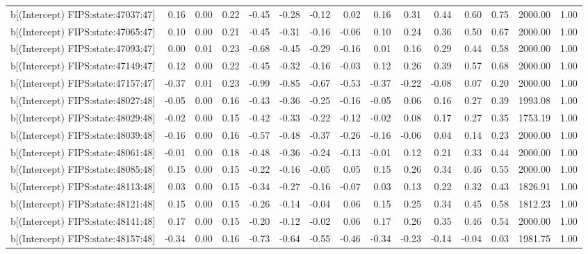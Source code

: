 \begin{table}[ht]
\begin{tabular}{rrrrrrrrrrrrrrr}
  b[(Intercept) FIPS:state:47037:47] & 0.16 & 0.00 & 0.22 & -0.45 & -0.28 & -0.12 & 0.02 & 0.16 & 0.31 & 0.44 & 0.60 & 0.75 & 2000.00 & 1.00 \\ 
  b[(Intercept) FIPS:state:47065:47] & 0.10 & 0.00 & 0.21 & -0.45 & -0.31 & -0.16 & -0.06 & 0.10 & 0.24 & 0.36 & 0.50 & 0.67 & 2000.00 & 1.00 \\ 
  b[(Intercept) FIPS:state:47093:47] & 0.00 & 0.01 & 0.23 & -0.68 & -0.45 & -0.29 & -0.16 & 0.01 & 0.16 & 0.29 & 0.44 & 0.58 & 2000.00 & 1.00 \\ 
  b[(Intercept) FIPS:state:47149:47] & 0.12 & 0.00 & 0.22 & -0.45 & -0.32 & -0.16 & -0.03 & 0.12 & 0.26 & 0.39 & 0.57 & 0.68 & 2000.00 & 1.00 \\ 
  b[(Intercept) FIPS:state:47157:47] & -0.37 & 0.01 & 0.23 & -0.99 & -0.85 & -0.67 & -0.53 & -0.37 & -0.22 & -0.08 & 0.07 & 0.20 & 2000.00 & 1.00 \\ 
  b[(Intercept) FIPS:state:48027:48] & -0.05 & 0.00 & 0.16 & -0.43 & -0.36 & -0.25 & -0.16 & -0.05 & 0.06 & 0.16 & 0.27 & 0.39 & 1993.08 & 1.00 \\ 
  b[(Intercept) FIPS:state:48029:48] & -0.02 & 0.00 & 0.15 & -0.42 & -0.33 & -0.22 & -0.12 & -0.02 & 0.08 & 0.17 & 0.27 & 0.35 & 1753.19 & 1.00 \\ 
  b[(Intercept) FIPS:state:48039:48] & -0.16 & 0.00 & 0.16 & -0.57 & -0.48 & -0.37 & -0.26 & -0.16 & -0.06 & 0.04 & 0.14 & 0.23 & 2000.00 & 1.00 \\ 
  b[(Intercept) FIPS:state:48061:48] & -0.01 & 0.00 & 0.18 & -0.48 & -0.36 & -0.24 & -0.13 & -0.01 & 0.12 & 0.21 & 0.33 & 0.44 & 2000.00 & 1.00 \\ 
  b[(Intercept) FIPS:state:48085:48] & 0.15 & 0.00 & 0.15 & -0.22 & -0.16 & -0.05 & 0.05 & 0.15 & 0.26 & 0.34 & 0.46 & 0.55 & 2000.00 & 1.00 \\ 
  b[(Intercept) FIPS:state:48113:48] & 0.03 & 0.00 & 0.15 & -0.34 & -0.27 & -0.16 & -0.07 & 0.03 & 0.13 & 0.22 & 0.32 & 0.43 & 1826.91 & 1.00 \\ 
  b[(Intercept) FIPS:state:48121:48] & 0.15 & 0.00 & 0.15 & -0.26 & -0.14 & -0.04 & 0.06 & 0.15 & 0.25 & 0.34 & 0.45 & 0.58 & 1812.23 & 1.00 \\ 
  b[(Intercept) FIPS:state:48141:48] & 0.17 & 0.00 & 0.15 & -0.20 & -0.12 & -0.02 & 0.06 & 0.17 & 0.26 & 0.35 & 0.46 & 0.54 & 2000.00 & 1.00 \\ 
  b[(Intercept) FIPS:state:48157:48] & -0.34 & 0.00 & 0.16 & -0.73 & -0.64 & -0.55 & -0.46 & -0.34 & -0.23 & -0.14 & -0.04 & 0.03 & 1981.75 & 1.00 \\ 

\end{tabular}
\end{table}
